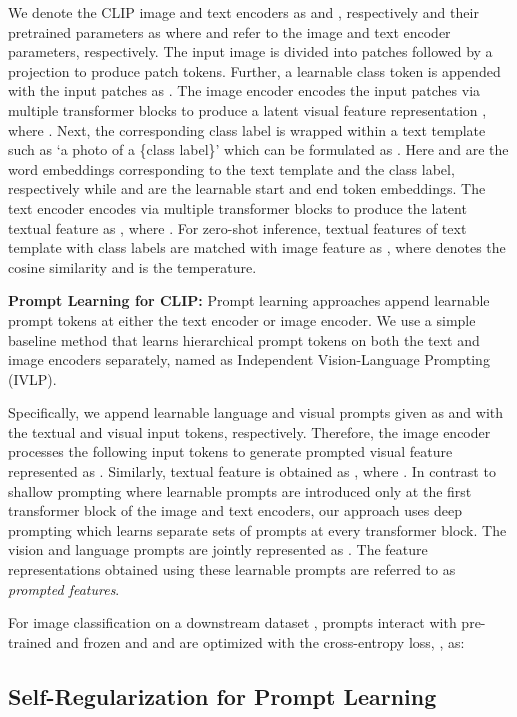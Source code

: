 \documentclass[10pt,twocolumn,letterpaper]{article}
\begin{document}
We denote the CLIP image and text encoders as  and , respectively and their pretrained parameters as  where  and  refer to the image and text encoder parameters, respectively. The input image  is divided into  patches followed by a projection to produce patch tokens.  Further, a learnable class token  is appended with the input patches as .
The image encoder  encodes the input patches via multiple transformer blocks to produce a latent visual feature representation , where . Next, the corresponding class label  is wrapped within a text template such as ‘a photo of a \{class label\}’ which can be formulated as . Here  and  are the word embeddings corresponding to the text template and the class label, respectively while   and   are the learnable start and end token embeddings. The text encoder  encodes  via multiple transformer blocks to produce the latent textual feature as , where . For zero-shot inference, textual features of text template with class labels 
are matched with image feature  as , where  denotes the cosine similarity and  is the temperature.


\noindent \textbf{Prompt Learning for CLIP:} Prompt learning approaches append learnable prompt tokens at either the text \cite{zhou2022learning, zhou2022conditional} encoder or image \cite{bahng2022visual} encoder. We use a simple baseline method \cite{rasheed2023fine} that learns hierarchical prompt tokens on both the text and image encoders separately, named as Independent Vision-Language Prompting (IVLP).

Specifically, we append learnable  language and  visual prompts given as  and  with the textual and visual input tokens, respectively. Therefore, the image encoder processes the following input tokens  to generate prompted visual feature represented as . Similarly, textual feature is obtained as , where . In contrast to shallow prompting where learnable prompts are introduced only at the first transformer block of the image and text encoders, our approach uses deep prompting which learns separate sets of prompts at every transformer block.   The vision and language  prompts are jointly represented as . The feature representations obtained using these learnable prompts are referred to as \emph{prompted features}. 

For image classification on a downstream dataset , prompts  interact with pre-trained and frozen  and  and are optimized with the cross-entropy loss, , as:



\subsection{Self-Regularization for Prompt Learning}
\label{sec:meth:self_regularization_prompt_learning}
\end{document}
